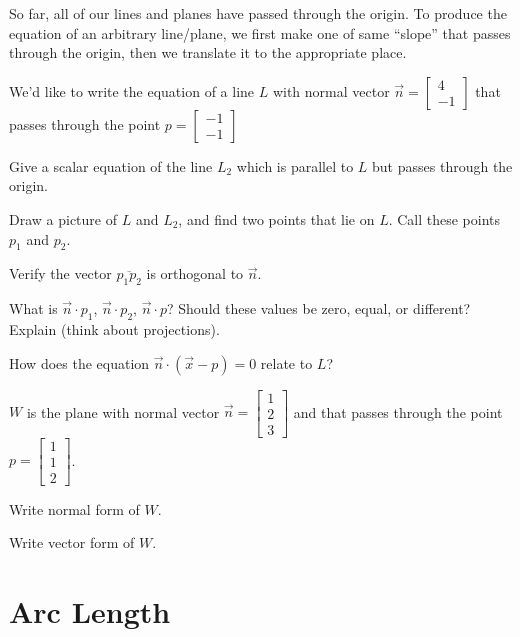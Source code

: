 \documentclass{problemset}
\newcommand{\mat}[1]{\begin{bmatrix}#1\end{bmatrix}}
\begin{document}
	So far, all of our lines and planes have passed through the origin. To 
	produce the equation of an arbitrary line/plane, we first make one of
	same ``slope'' that passes through the origin, then we translate it
	to the appropriate place.

	\question
	We'd like to write the equation of a line $L$ with normal vector
	$\vec n=\begin{bmatrix}4\\-1\end{bmatrix}$ that passes through
	the point $p=\mat{-1\\-1}$

	\begin{parts}
		\item Give a scalar equation of the line $L_2$ which is parallel to $L$
		but passes through the origin.
		\item Draw a picture of $L$ and $L_2$, and find two points that lie on
		$L$.  Call these points $p_1$ and $p_2$.
		\item Verify the vector $\overline {p_1p_2}$ is orthogonal to $\vec n$.
		\item What is $\vec n\cdot p_1$, $\vec n\cdot p_2$, $\vec n\cdot p$?
		Should these values be zero, equal, or different?  Explain (think about
		projections).
		\item How does the equation $\vec n\cdot (\vec x-p)=0$ relate to $L$?
	\end{parts}

	\question
	$W$ is the plane with normal vector $\vec n=\mat{1\\2\\3}$ and that passes through
	the point $p=\mat{1\\1\\2}$.
	\begin{parts}
		\item Write normal form of $W$.
		\item Write vector form of $W$.
	\end{parts}


\section*{Arc Length}
\end{document}
